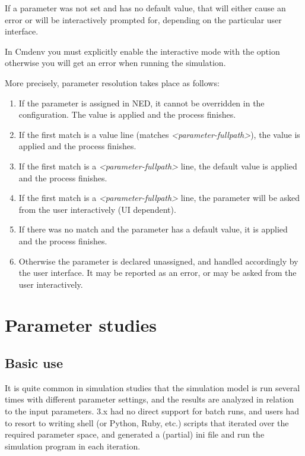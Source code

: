 If a parameter was not set and has no default value, that will either
cause an error or will be interactively prompted for, depending
on the particular user interface.

\begin{note}
In Cmdenv you must explicitly enable the interactive mode with the 
 option otherwise you will get an error 
when running the simulation.
\end{note}

More precisely, parameter resolution takes place as follows:

\begin{enumerate}
\item If the parameter is assigned in NED, it cannot be overridden in the
    configuration. The value is applied and the process finishes.
\item If the first match is a value line (matches \textit{<parameter-fullpath>}),
    the value is applied and the process finishes.
\item If the first match is a \textit{<parameter-fullpath>} line,
    the default value is applied and the process finishes.
\item If the first match is a \textit{<parameter-fullpath>} line,
    the parameter will be asked from the user interactively (UI dependent).
\item If there was no match and the parameter has a default value, it is applied
    and the process finishes.
\item Otherwise the parameter is declared unassigned, and handled accordingly
    by the user interface. It may be reported as an error, or may be
    asked from the user interactively.
\end{enumerate}


\section{Parameter studies}

\subsection{Basic use}


It is quite common in simulation studies that the simulation model is
run several times with different parameter settings, and the results
are analyzed in relation to the input parameters. {\opp} 3.x had no
direct support for batch runs, and users had to resort to writing shell
(or Python, Ruby, etc.) scripts that iterated over the required
parameter space, and generated a (partial) ini file and run the
simulation program in each iteration.

